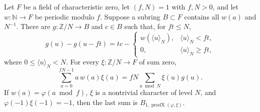 \begin{proposition}
\label{prop:br-partial}
Let $F$ be a field of characteristic zero, let $(f,N)=1$ with
$f,N>0$, and let $w:\mathbb N\to F$ be periodic modulo $f$.
Suppose a subring $B\subset F$ contains all $w(a)$ and $N^{-1}$.
There are $g:\mathbb Z/N\to B$ and $c\in B$ such that, for
$ft\le N$,
\[
 g(u)-g(u-ft)=tc-
           \begin{cases}w(\langle u\rangle_N),&
                          \langle u\rangle_N<ft,\\0,&
                          \langle u\rangle_N\ge ft,
           \end{cases}
 \tag{BR.10}
\]
where $0\le\langle u\rangle_N<N$.
For every $\xi:\mathbb Z/N\to F$ of sum zero,
\[
 \sum_{a=0}^{fN-1}a\,w(a)\xi(a)
             =fN\sum_{u\bmod N}\xi(u)g(u).
 \tag{BR.11}
\]
If $w(a)=\varphi(a\bmod f)$, $\xi$ is a nontrivial character
of level $N$, and $\varphi(-1)\xi(-1)=-1$, then the last sum is
$B_{1,\operatorname{prodX}(\varphi,\xi)}$.
\end{proposition}

